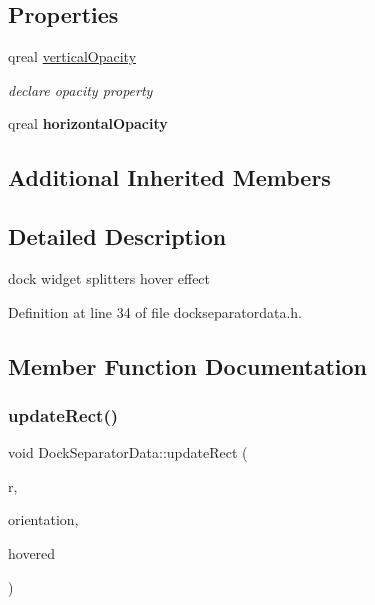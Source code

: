 \subsection*{Properties}
\begin{DoxyCompactItemize}
\item 
\mbox{\label{class_dock_separator_data_a98e78718f13a567720dbcfeeeaeb1ea2}} 
qreal \hyperlink{class_dock_separator_data_a98e78718f13a567720dbcfeeeaeb1ea2}{vertical\+Opacity}
\begin{DoxyCompactList}\small\item\em declare opacity property \end{DoxyCompactList}\item 
\mbox{\label{class_dock_separator_data_ac11fbfbd6329bde300f7442e9955a7fe}} 
qreal {\bfseries horizontal\+Opacity}
\end{DoxyCompactItemize}
\subsection*{Additional Inherited Members}


\subsection{Detailed Description}
dock widget splitters hover effect 

Definition at line 34 of file dockseparatordata.\+h.



\subsection{Member Function Documentation}
\mbox{\label{class_dock_separator_data_a03604d5af7ac81a5351a08424a248830}} 
\subsubsection{\texorpdfstring{update\+Rect()}{updateRect()}}
{\footnotesize\ttfamily void Dock\+Separator\+Data\+::update\+Rect (\begin{DoxyParamCaption}\item[{const Q\+Rect \&}]{r,  }\item[{const Qt\+::\+Orientation \&}]{orientation,  }\item[{bool}]{hovered }\end{DoxyParamCaption})\hspace{0.3cm}{\ttfamily [virtual]}}


